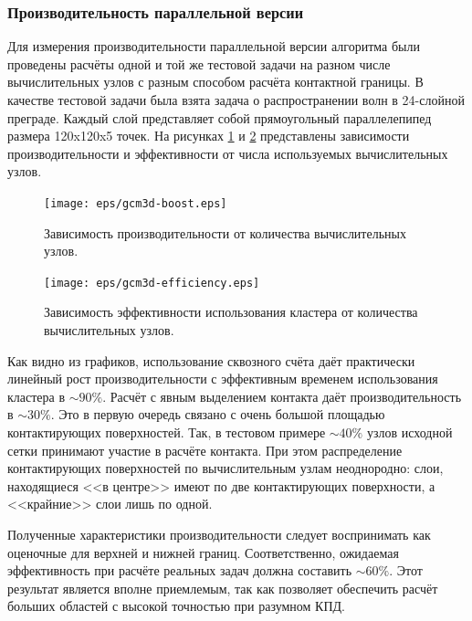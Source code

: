 \subsubsection{Производительность параллельной версии}
Для измерения производительности параллельной версии алгоритма были проведены
расчёты одной и той же тестовой задачи на разном числе вычислительных узлов с
разным способом расчёта контактной границы. В
качестве тестовой задачи была взята задача о распространении волн в 24-слойной
преграде. Каждый слой представляет собой прямоугольный параллелепипед размера
120x120x5 точек. На рисунках \ref{pic:gcm_boost} и
\ref{pic:gcm_efficiency} представлены зависимости производительности и
эффективности от числа используемых вычислительных узлов.
\begin{figure}[htp]
\centering
\texttt{[image: eps/gcm3d-boost.eps]}
\caption{Зависимость производительности от количества вычислительных узлов.}
\label{pic:gcm_boost}
\end{figure}
\begin{figure}[htp]
\centering
\texttt{[image: eps/gcm3d-efficiency.eps]}
\caption{Зависимость эффективности использования кластера от количества
вычислительных узлов.}
\label{pic:gcm_efficiency}
\end{figure}

Как видно из графиков, использование сквозного счёта даёт практически линейный
рост производительности с эффективным временем использования кластера в $\sim
90\%$.
Расчёт с явным выделением контакта даёт производительность в $\sim30\%$. Это  в
первую очередь связано с очень большой площадью контактирующих поверхностей. Так, в тестовом
примере $\sim 40\%$ узлов исходной сетки принимают участие в расчёте контакта.
При этом распределение контактирующих поверхностей по вычислительным узлам
неоднородно: слои, находящиеся <<в центре>> имеют по две контактирующих
поверхности, а <<крайние>> слои лишь по одной.

Полученные характеристики производительности следует воспринимать как оценочные
для верхней и нижней границ. Соответственно, ожидаемая эффективность при расчёте
реальных задач должна составить $\sim 60\%$. Этот результат является вполне
приемлемым, так как позволяет обеспечить расчёт больших областей с высокой
точностью при разумном КПД.
